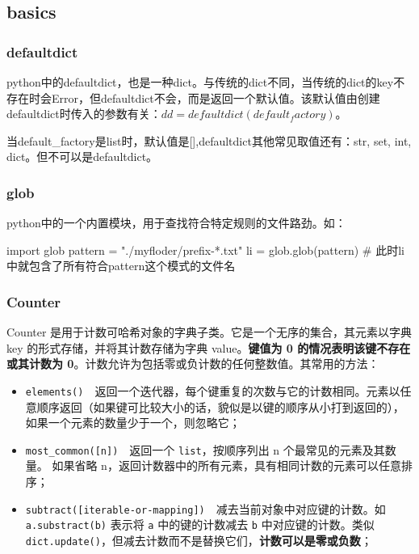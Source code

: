 \subsection{basics}
\subsubsection{defaultdict} python中的defaultdict，也是一种dict。与传统的dict不同，当传统的dict的key不存在时会Error，但defaultdict不会，而是返回一个默认值。该默认值由创建defaultdict时传入的参数有关：$dd = defaultdict(default_factory)$。

当default\_factory是list时，默认值是[],defaultdict其他常见取值还有：str, set, int, dict。但不可以是defaultdict。

\subsubsection{glob} python中的一个内置模块，用于查找符合特定规则的文件路劲。如：
\begin{python}
	import glob
	pattern = "./myfloder/prefix-*.txt"
	li = glob.glob(pattern) # 此时li中就包含了所有符合pattern这个模式的文件名
\end{python}

\subsubsection{Counter}
Counter 是用于计数可哈希对象的字典子类。它是一个无序的集合，其元素以字典 key 的形式存储，并将其计数存储为字典 value。\textbf{键值为 0 的情况表明该键不存在或其计数为 0}。计数允许为包括零或负计数的任何整数值。其常用的方法：
\begin{itemize}
	\item \texttt{elements()}\ \ 返回一个迭代器，每个键重复的次数与它的计数相同。元素以任意顺序返回（如果键可比较大小的话，貌似是以键的顺序从小打到返回的），如果一个元素的数量少于一个，则忽略它；
	
	\item \texttt{most_common([n])}\ \ 返回一个 \texttt{list}，按顺序列出 n 个最常见的元素及其数量。 如果省略 n，返回计数器中的所有元素，具有相同计数的元素可以任意排序；
	
	\item \texttt{subtract([iterable-or-mapping])}\ \ 减去当前对象中对应键的计数。如 \texttt{a.substract(b)} 表示将 \texttt{a} 中的键的计数减去 \texttt{b} 中对应键的计数。类似 \texttt{dict.update()}，但减去计数而不是替换它们，\textbf{计数可以是零或负数}；
\end{itemize}

